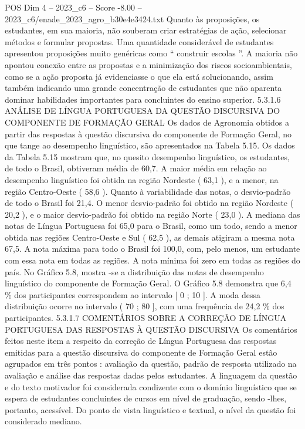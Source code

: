 \begin{textsample}{POS Dim 4 – 2023\_c6 – Score -8.00 – 2023\_c6/enade\_2023\_agro\_b30e4e3424.txt}
Quanto às proposições, os estudantes, em sua maioria, não souberam criar estratégias de ação, selecionar métodos e formular propostas.
Uma quantidade considerável de estudantes apresentou proposições muito genéricas como “ construir escolas ”.
A maioria não apontou conexão entre as propostas e a minimização dos riscos socioambientais, como se a ação proposta já evidenciasse o que ela está solucionando, assim também indicando uma grande concentração de estudantes que não aparenta dominar habilidades importantes para concluintes do ensino superior. 5.3.1.6 ANÁLISE DE LÍNGUA PORTUGUESA DA QUESTÃO DISCURSIVA DO COMPONENTE DE FORMAÇÃO GERAL Os dados de Agronomia obtidos a partir das respostas à questão discursiva do componente de Formação Geral, no que tange ao desempenho linguístico, são apresentados na Tabela 5.15.
Os dados da Tabela 5.15 mostram que, no quesito desempenho linguístico, os estudantes, de todo o Brasil, obtiveram média de 60,7.
A maior média em relação ao desempenho linguístico foi obtida na região Nordeste ( 63,1 ), e a menor, na região Centro-Oeste ( 58,6 ).
Quanto à variabilidade das notas, o desvio-padrão de todo o Brasil foi 21,4.
O menor desvio-padrão foi obtido na região Nordeste ( 20,2 ), e o maior desvio-padrão foi obtido na região Norte ( 23,0 ).
A mediana das notas de Língua Portuguesa foi 65,0 para o Brasil, como um todo, sendo a menor obtida nas regiões Centro-Oeste e Sul ( 62,5 ), as demais atigiram a mesma nota 67,5.
A nota máxima para todo o Brasil foi 100,0, com, pelo menos, um estudante com essa nota em todas as regiões.
A nota mínima foi zero em todas as regiões do país.
No Gráfico 5.8, mostra -se a distribuição das notas de desempenho linguístico do componente de Formação Geral.
O Gráfico 5.8 demonstra que 6,4 \% dos participantes correspondem ao intervalo [ 0 ; 10 ].
A moda dessa distribuição ocorre no intervalo ( 70 ; 80 ], com uma frequência de 24,2 \% dos participantes. 5.3.1.7 COMENTÁRIOS SOBRE A CORREÇÃO DE LÍNGUA PORTUGUESA DAS RESPOSTAS À QUESTÃO DISCURSIVA Os comentários feitos neste item a respeito da correção de Língua Portuguesa das respostas emitidas para a questão discursiva do componente de Formação Geral estão agrupados em três pontos : avaliação da questão, padrão de resposta utilizado na avaliação e análise das respostas dadas pelos estudantes.
A linguagem da questão e do texto motivador foi considerada condizente com o domínio linguístico que se espera de estudantes concluintes de cursos em nível de graduação, sendo -lhes, portanto, acessível.
Do ponto de vista linguístico e textual, o nível da questão foi considerado mediano.

\end{textsample}

